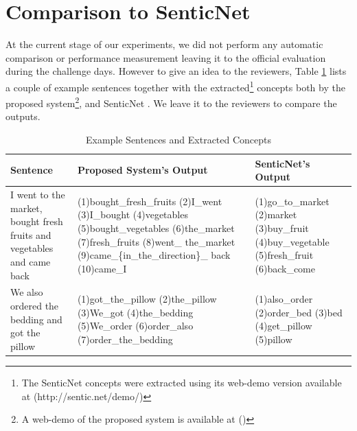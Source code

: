\documentclass[runningheads,a4paper]{llncs}
\begin{document}
\section{Comparison to SenticNet}
At the current stage of our experiments, we did not perform any automatic comparison or performance measurement leaving it to the official evaluation during the challenge days. However to give an idea to the reviewers, Table \ref{tab:sen-conc-compare} lists a couple of example sentences together with the extracted\footnote{The SenticNet concepts were extracted using its web-demo version available at (http://sentic.net/demo/)} concepts both by the proposed system\footnote{A web-demo of the proposed system is available at ()}, and SenticNet \cite{senticnet}. We leave it to the reviewers to compare the outputs. 
\begin{table}[!h]
\centering
\begin{tabular}{>{\raggedright}p{3cm}>{\raggedright}p{5.5cm}p{3.5cm}<{\raggedright}}
\hline \textbf{Sentence} & \textbf{Proposed System's Output}  & \textbf{SenticNet's Output} \\ 
\hline I went to the market, bought fresh fruits and vegetables and came back &(1)bought\_fresh\_fruits (2)I\_went (3)I\_bought (4)vegetables (5)bought\_vegetables (6)the\_market (7)fresh\_fruits (8)went\_ the\_market  (9)came\_\{in\_the\_direction\}\_ back  (10)came\_I &(1)go\_to\_market (2)market (3)buy\_fruit (4)buy\_vegetable (5)fresh\_fruit (6)back\_come\\ 
\hline We also ordered the bedding and got the pillow & (1)got\_the\_pillow (2)the\_pillow (3)We\_got (4)the\_bedding (5)We\_order (6)order\_also (7)order\_the\_bedding & (1)also\_order (2)order\_bed (3)bed (4)get\_pillow (5)pillow \\ 
\hline 
\end{tabular}  
\caption{Example Sentences and Extracted Concepts}
\label{tab:sen-conc-compare}
\end{table}

\end{document}
